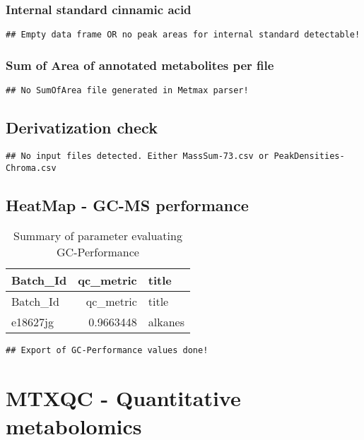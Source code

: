 \documentclass[9pt,]{article}
\begin{document}
\subsubsection{Internal standard cinnamic
acid}\label{internal-standard-cinnamic-acid}

\begin{verbatim}
## Empty data frame OR no peak areas for internal standard detectable!
\end{verbatim}

\subsubsection{Sum of Area of annotated metabolites per
file}\label{sum-of-area-of-annotated-metabolites-per-file}

\begin{verbatim}
## No SumOfArea file generated in Metmax parser!
\end{verbatim}

\subsection{Derivatization check}\label{derivatization-check}

\begin{verbatim}
## No input files detected. Either MassSum-73.csv or PeakDensities-Chroma.csv
\end{verbatim}

\subsection{HeatMap - GC-MS
performance}\label{heatmap---gc-ms-performance}

\begin{longtable}[]{@{}lrl@{}}
\caption{Summary of parameter evaluating GC-Performance}\tabularnewline
\toprule
Batch\_Id & qc\_metric & title\tabularnewline
\midrule
\endfirsthead
\toprule
Batch\_Id & qc\_metric & title\tabularnewline
\midrule
\endhead
e18627jg & 0.9663448 & alkanes\tabularnewline
\bottomrule
\end{longtable}

\begin{verbatim}
## Export of GC-Performance values done!
\end{verbatim}

\section{MTXQC - Quantitative
metabolomics}\label{mtxqc---quantitative-metabolomics}
\end{document}
